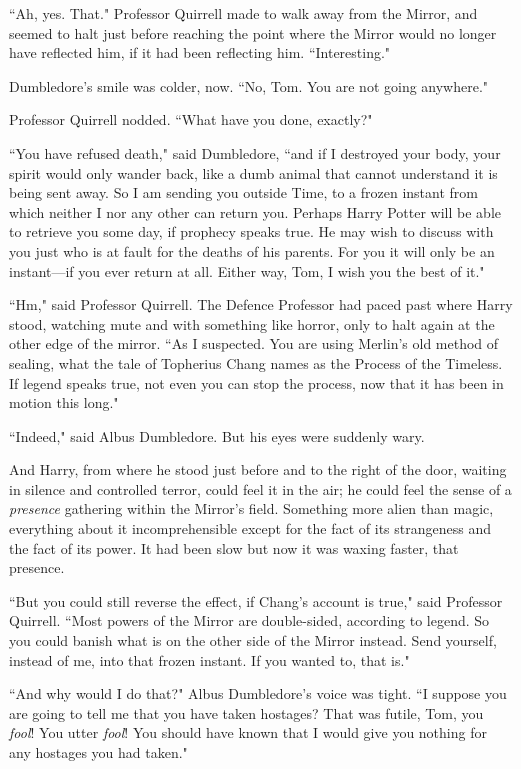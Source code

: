 ``Ah, yes. That." Professor Quirrell made to walk away from the Mirror, and seemed to halt just before reaching the point where the Mirror would no longer have reflected him, if it had been reflecting him. ``Interesting."

Dumbledore's smile was colder, now. ``No, Tom. You are not going anywhere."

Professor Quirrell nodded. ``What have you done, exactly?"

``You have refused death," said Dumbledore, ``and if I destroyed your body, your spirit would only wander back, like a dumb animal that cannot understand it is being sent away. So I am sending you outside Time, to a frozen instant from which neither I nor any other can return you. Perhaps Harry Potter will be able to retrieve you some day, if prophecy speaks true. He may wish to discuss with you just who is at fault for the deaths of his parents. For you it will only be an instant—if you ever return at all. Either way, Tom, I wish you the best of it."

``Hm," said Professor Quirrell. The Defence Professor had paced past where Harry stood, watching mute and with something like horror, only to halt again at the other edge of the mirror. ``As I suspected. You are using Merlin's old method of sealing, what the tale of Topherius Chang names as the Process of the Timeless. If legend speaks true, not even you can stop the process, now that it has been in motion this long."

``Indeed," said Albus Dumbledore. But his eyes were suddenly wary.

And Harry, from where he stood just before and to the right of the door, waiting in silence and controlled terror, could feel it in the air; he could feel the sense of a \emph{presence} gathering within the Mirror's field. Something more alien than magic, everything about it incomprehensible except for the fact of its strangeness and the fact of its power. It had been slow but now it was waxing faster, that presence.

``But you could still reverse the effect, if Chang's account is true," said Professor Quirrell. ``Most powers of the Mirror are double-sided, according to legend. So you could banish what is on the other side of the Mirror instead. Send yourself, instead of me, into that frozen instant. If you wanted to, that is."

``And why would I do that?" Albus Dumbledore's voice was tight. ``I suppose you are going to tell me that you have taken hostages? That was futile, Tom, you \emph{fool}! You utter \emph{fool}! You should have known that I would give you nothing for any hostages you had taken."

